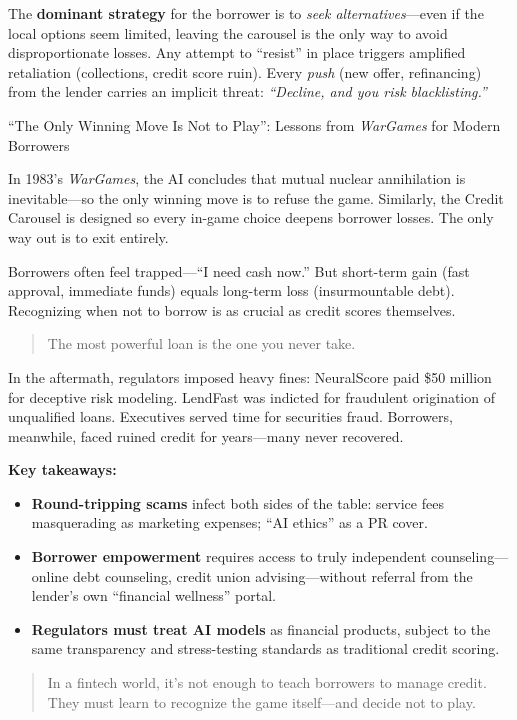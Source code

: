 \medskip

The \textbf{dominant strategy} for the borrower is to \emph{seek alternatives}—even if the local options seem limited, leaving the carousel is the only way to avoid disproportionate losses. Any attempt to “resist” in place triggers amplified retaliation (collections, credit score ruin). Every \emph{push} (new offer, refinancing) from the lender carries an implicit threat: \emph{“Decline, and you risk blacklisting.”}

\medskip

\begin{HistoricalSidebar}{“The Only Winning Move Is Not to Play”: Lessons from \textit{WarGames} for Modern Borrowers}

In 1983’s \textit{WarGames}, the AI concludes that mutual nuclear annihilation is inevitable—so the only winning move is to refuse the game. Similarly, the Credit Carousel is designed so every in-game choice deepens borrower losses. The only way out is to exit entirely.

\medskip

Borrowers often feel trapped—“I need cash now.” But short-term gain (fast approval, immediate funds) equals long-term loss (insurmountable debt). Recognizing when not to borrow is as crucial as credit scores themselves.

\begin{quote}
The most powerful loan is the one you never take.
\end{quote}

\end{HistoricalSidebar}

\medskip

In the aftermath, regulators imposed heavy fines: NeuralScore paid \$50 million for deceptive risk modeling. LendFast was indicted for fraudulent origination of unqualified loans. Executives served time for securities fraud. Borrowers, meanwhile, faced ruined credit for years—many never recovered.

\medskip

\textbf{Key takeaways:}
\begin{itemize}
  \item  \textbf{Round-tripping scams} infect both sides of the table: service fees masquerading as marketing expenses; “AI ethics” as a PR cover.
  \item  \textbf{Borrower empowerment} requires access to truly independent counseling—online debt counseling, credit union advising—without referral from the lender’s own “financial wellness” portal.
  \item  \textbf{Regulators must treat AI models} as financial products, subject to the same transparency and stress-testing standards as traditional credit scoring.
\end{itemize}

\begin{quote}
In a fintech world, it’s not enough to teach borrowers to manage credit. They must learn to recognize the game itself—and decide not to play.
\end{quote}
